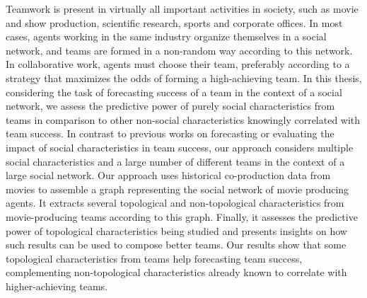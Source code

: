 Teamwork is present in virtually all important activities in society, such as
movie and show production, scientific research, sports and corporate offices.
In most cases, agents working in the same industry organize themselves in a
social network, and teams are formed in a non-random way according to this
network. In collaborative work, agents must choose their team, preferably
according to a strategy that maximizes the odds of forming a high-achieving
team. In this thesis, considering the task of forecasting success of a team in
the context of a social network, we assess the predictive power of purely
social characteristics from teams in comparison to other non-social
characteristics knowingly correlated with team success. In contrast to previous
works on forecasting or evaluating the impact of social characteristics in team
success, our approach considers multiple social characteristics and a large
number of different teams in the context of a large social network. Our
approach uses historical co-production data from movies to assemble a graph
representing the social network of movie producing agents. It extracts several
topological and non-topological characteristics from movie-producing teams
according to this graph. Finally, it assesses the predictive power of
topological characteristics being studied and presents insights on how such
results can be used to compose better teams. Our results show that some
topological characteristics from teams help forecasting team success,
complementing non-topological characteristics already known to correlate with
higher-achieving teams.

